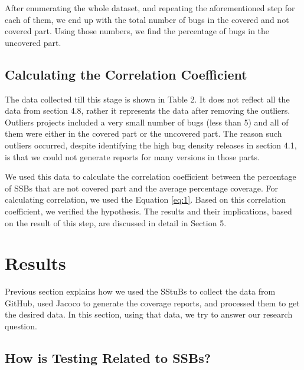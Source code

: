 \documentclass[sigconf,nonacm]{acmart}
\begin{document}
After enumerating the whole dataset, and repeating the aforementioned step for each of them, we end up with the total number of bugs in the covered and not covered part. Using those numbers, we find the percentage of bugs in the uncovered part.

\subsection{Calculating the Correlation Coefficient}

The data collected till this stage is shown in Table 2. It does not reflect all the data from section 4.8, rather it represents the data after removing the outliers. Outliers projects included a very small number of bugs (less than 5) and all of them were either in the covered part or the uncovered part. The reason such outliers occurred, despite identifying the high bug density releases in section 4.1, is that we could not generate reports for many versions in those parts.

We used this data to calculate the correlation coefficient between the percentage of SSBs that are not covered part and the average percentage coverage. For calculating correlation, we used the Equation \ref{eq:1}. Based on this correlation coefficient, we verified the hypothesis. The results and their implications, based on the result of this step, are discussed in detail in Section 5.

\section{Results}
Previous section explains how we used the SStuBs to collect the data from GitHub, used Jacoco to generate the coverage reports, and processed them to get the desired data. In this section, using that data, we try to answer our research question.

\subsection{How is Testing Related to SSBs?}
\end{document}
